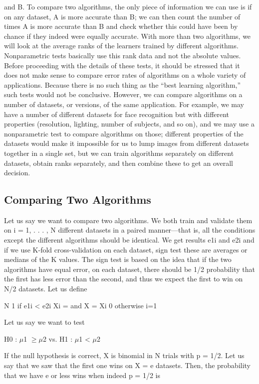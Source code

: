 and B. To compare two algorithms, the only piece of information we can use is if on any dataset, A is more accurate than B; we can then count the number of times A is more accurate than B and check whether this could have been by chance if they indeed were equally accurate. With more than two algorithms, we will look at the average ranks of the learners trained by different algorithms. Nonparametric tests basically use this rank data and not the absolute values. Before proceeding with the details of these tests, it should be stressed that it does not make sense to compare error rates of algorithms on a whole variety of applications. Because there is no such thing as the “best learning algorithm,” such tests would not be conclusive. However, we can compare algorithms on a number of datasets, or versions, of the same application. For example, we may have a number of different datasets for face recognition but with different properties (resolution, lighting, number of subjects, and so on), and we may use a nonparametric test to compare algorithms on those; different properties of the datasets would make it impossible for us to lump images from different datasets together in a single set, but we can train algorithms separately on different datasets, obtain ranks separately, and then combine these to get an overall decision.

\subsection{Comparing Two Algorithms}

Let us say we want to compare two algorithms. We both train and validate them on i = 1, . . . , N different datasets in a paired manner---that is, all the conditions except the different algorithms should be identical. We get results e1i and e2i and if we use K-fold cross-validation on each dataset, sign test these are averages or medians of the K values. The sign test is based on the idea that if the two algorithms have equal error, on each dataset, there should be 1/2 probability that the first has less error than the second, and thus we expect the first to win on N/2 datasets. Let us define

N 1 if e1i < e2i Xi = and X = Xi 0 otherwise i=1

Let us say we want to test

H0 : $\mu$1 $\geq$$\mu$2 vs. H1 : $\mu$1 < $\mu$2

If the null hypothesis is correct, X is binomial in N trials with p = 1/2. Let us say that we saw that the first one wins on X = e datasets. Then, the probability that we have e or less wins when indeed p = 1/2 is

